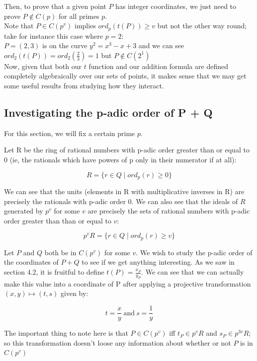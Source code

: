 \documentclass{article}
\begin{document}
Then, to prove that a given point $P$ has integer coordinates, we just need to prove $P \notin C(p)$ for all primes $p$.\\

Note that $P \in C(p^v)$ implies $ord_p(t(P)) \geq v$ but not the other way round; take for instance this case where $p = 2$:\\

$P = (2, 3)$ is on the curve $y^2 = x^3 - x + 3$ and we can see $ord_2(t(P)) = ord_2(\frac{2}{3}) = 1$ but $P \notin C(2^1)$ \\

Now, given that both our $t$ function and our addition formula are defined completely algebraically over our sets of points, it makes sense that we may get some useful results from studying how they interact.

\subsection{Investigating the p-adic order of P + Q}

For this section, we will fix a certain prime $p$.

Let R be the ring of rational numbers with p-adic order greater than or equal to 0 (ie, the rationals which have powers of p only in their numerator if at all):

\[ R = \{r \in Q \; | \; ord_p(r) \geq 0\} \]

We can see that the units (elements in R with multiplicative inverses in R) are precisely the rationals with p-adic order 0. We can also see that the ideals of $R$ generated by $p^v$ for some $v$ are precisely the sets of rational numbers with p-adic order greater than than or equal to $v$:

\[ p^vR = \{r \in Q \; | \; ord_p(r) \geq v\} \]

Let $P$ and $Q$ both be in $C(p^v)$ for some $v$. We wish to study the p-adic order of the coordinates of $P + Q$ to see if we get anything interesting. As we saw in section 4.2, it is fruitful to define $t(P) = \frac{x_P}{y_P}$. We can see that we can actually make this value into a coordinate of P after applying a projective transformation $(x, y) \mapsto (t, s)$ given by:

\[ t = \frac{x}{y} \ \text{and} \ s = \frac{1}{y} \]

The important thing to note here is that $P \in C(p^v)$ iff $t_P \in p^v R$ and $s_P \in p^{3v} R$; so this transformation doesn't loose any information about whether or not $P$ is in $C(p^v)$\\
\end{document}
